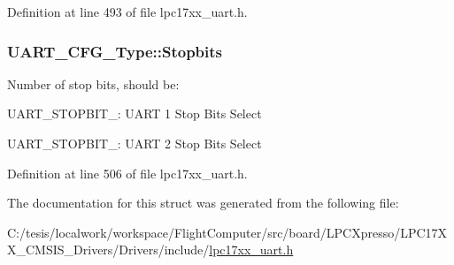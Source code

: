 \-Definition at line 493 of file lpc17xx\-\_\-uart.\-h.

\hypertarget{struct_u_a_r_t___c_f_g___type_afbf7b4f60c9d420b2bb41b58bb0212f6}{
\subsubsection[{\-Stopbits}]{ {\bf \-U\-A\-R\-T\-\_\-\-C\-F\-G\-\_\-\-Type\-::\-Stopbits}}}\label{struct_u_a_r_t___c_f_g___type_afbf7b4f60c9d420b2bb41b58bb0212f6}
\-Number of stop bits, should be\-:
\begin{DoxyItemize}
\item \-U\-A\-R\-T\-\_\-\-S\-T\-O\-P\-B\-I\-T\-\_\-: \-U\-A\-R\-T 1 \-Stop \-Bits \-Select
\item \-U\-A\-R\-T\-\_\-\-S\-T\-O\-P\-B\-I\-T\-\_\-: \-U\-A\-R\-T 2 \-Stop \-Bits \-Select 
\end{DoxyItemize}

\-Definition at line 506 of file lpc17xx\-\_\-uart.\-h.



\-The documentation for this struct was generated from the following file\-:\begin{DoxyCompactItemize}
\item 
\-C\-:/tesis/localwork/workspace/\-Flight\-Computer/src/board/\-L\-P\-C\-Xpresso/\-L\-P\-C17\-X\-X\-\_\-\-C\-M\-S\-I\-S\-\_\-\-Drivers/\-Drivers/include/\hyperlink{lpc17xx__uart_8h}{lpc17xx\-\_\-uart.\-h}\end{DoxyCompactItemize}
